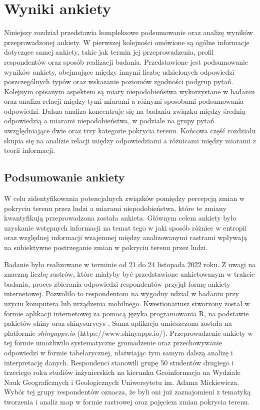 \documentclass{amuthesis}
\begin{document}

\hypertarget{sec-wyniki}{%
\chapter{Wyniki ankiety}\label{sec-wyniki}}

Niniejszy rozdział przedstawia kompleksowe podsumowanie oraz analizę
wyników przeprowadzonej ankiety. W pierwszej kolejności omówione są
ogólne informacje dotyczące samej ankiety, takie jak termin jej
przeprowadzenia, profil respondentów oraz sposób realizacji badania.
Przedstawione jest podsumowanie wyników ankiety, obejmujące między
innymi liczbę udzielonych odpowiedzi poszczególnych typów oraz wskazanie
poziomów zgodności podgrup pytań. Kolejnym opisanym aspektem są miary
niepodobieństwa wykorzystane w badaniu oraz analiza relacji między tymi
miarami a różnymi sposobami podsumowania odpowiedzi. Dalsza analiza
koncentruje się na badaniu związku między średnią odpowiedzią a miarami
niepodobieństwa, w podziale na grupy pytań uwzględniające dwie oraz trzy
kategorie pokrycia terenu. Końcowa część rozdziału skupia się na
analizie relacji między odpowiedziami a różnicami między miarami z
teorii informacji.

\hypertarget{podsumowanie-ankiety}{%
\section{Podsumowanie ankiety}\label{podsumowanie-ankiety}}

W celu zidentyfikowania potencjalnych związków pomiędzy percepcją zmian
w pokryciu terenu przez ludzi a miarami niepodobieństwa, które te zmiany
kwantyfikują przeprowadzona została ankieta. Głównym celem ankiety było
uzyskanie wstępnych informacji na temat tego w jaki sposób różnice w
entropii oraz względnej informacji wzajemnej między analizowanymi
rastrami wpływają na subiektywne postrzeganie zmian w pokryciu terenu
przez ludzi.

Badanie było realizowane w terminie od 21 do 24 listopada 2022 roku. Z
uwagi na znaczną liczbę rastrów, które miałyby być przedstawione
ankietowanym w trakcie badania, proces zbierania odpowiedzi respondentów
przyjął formę ankiety internetowej. Pozwoliło to respondentom na wygodny
udział w badaniu przy użyciu komputera lub urządzenia mobilnego.
Kwestionariusz stworzony został w formie aplikacji internetowej za
pomocą języka programowania R, na podstawie pakietów shiny
\autocite*{R-shiny} oraz shinysurveys \autocite*{R-shinysurveys}. Sama
aplikacja umieszczona została na platformie \emph{shinyapps.io}
(https://www.shinyapps.io/). Przeprowadzenie ankiety w tej formie
umożliwiło systematyczne gromadzenie oraz przechowywanie odpowiedzi w
formie tabelarycznej, ułatwiając tym samym dalszą analizę i
interpretację danych. Respondenci stanowili grupę 50 studentów drugiego
i trzeciego roku studiów inżynierskich na kierunku Geoinformacja na
Wydziale Nauk Geograficznych i Geologicznych Uniwersytetu im. Adama
Mickiewicza. Wybór tej grupy respondentów oznacza, że byli oni już
zaznajomieni z tematyką tworzenia i analiz map w formie rastrowej oraz
pojęciem zmian pokrycia terenu.
\end{document}
